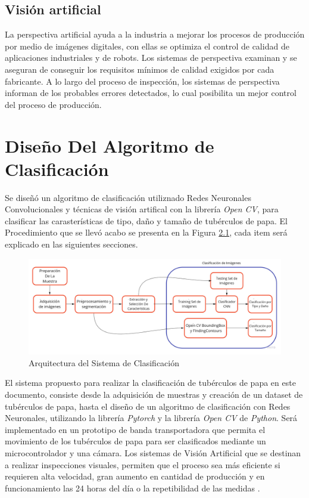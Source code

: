 	\section{Visión artificial} La perspectiva artificial ayuda a la industria a mejorar los procesos de producción por medio de imágenes digitales, con ellas se optimiza el control de calidad de aplicaciones industriales y de robots. Los sistemas de perspectiva examinan y se aseguran de conseguir los requisitos mínimos de calidad exigidos por cada fabricante. A lo largo del proceso de inspección, los sistemas de perspectiva informan de los probables errores detectados, lo cual posibilita un mejor control del proceso de producción.


\chapter{Diseño Del Algoritmo de Clasificación}


Se diseñó un algoritmo de clasificación utiliznado Redes Neuronales Convolucionales y técnicas de visión artifical con la librería \textit{Open CV}, para clasificar las carasterísticas de tipo, daño y tamaño de tubérculos de papa. El Procedimiento que se llevó acabo se presenta en la Figura \ref{fig:flujogeneral}, cada item será explicado en las siguientes secciones. 


\begin{figure}[ht]
	\centering
	\includegraphics[scale=0.3]{Figs/FGGeneral.jpg}
	\caption{Arquitectura del Sistema de Clasificación}
	\label{fig:flujogeneral}
\end{figure}

El sistema propuesto para realizar la clasificación de tubérculos de papa en este documento, consiste desde la adquisición de muestras y creación de un dataset de tubérculos de papa, hasta el diseño de un algoritmo de clasificación con Redes Neuronales, utilizando la librería \textit{Pytorch} y la librería \textit{Open CV} de \textit{Python}. Será implementado en un prototipo de banda transportadora que permita el movimiento de los tubérculos de papa para ser clasificados mediante un microcontrolador y una cámara. Los sistemas de Visión Artificial que se destinan a realizar inspecciones visuales, permiten que el proceso sea más eficiente si requieren alta velocidad, gran aumento en cantidad de producción y en funcionamiento las 24 horas del día o la repetibilidad de las medidas \cite{artificial2012aplicacion}.


